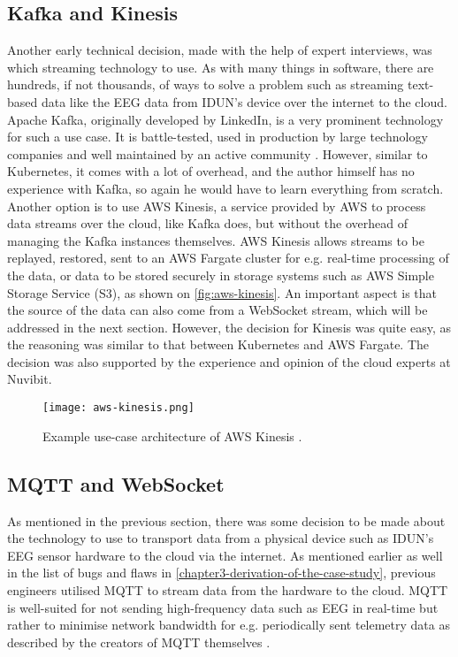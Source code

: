 \subsection{Kafka and Kinesis}
\label{chapter4-kafka-aws-kinesis}

Another early technical decision, made with the help of expert interviews, was which streaming technology to use. As with many things in software, there are hundreds, if not thousands, of ways to solve a problem such as streaming text-based data like the EEG data from IDUN's device over the internet to the cloud. Apache Kafka, originally developed by LinkedIn, is a very prominent technology for such a use case. It is battle-tested, used in production by large technology companies \citep{apache_apache_nodate} and well maintained by an active community \citep{noauthor_apache_2022}. However, similar to Kubernetes, it comes with a lot of overhead, and the author himself has no experience with Kafka, so again he would have to learn everything from scratch. Another option is to use AWS Kinesis, a service provided by AWS to process data streams over the cloud, like Kafka does, but without the overhead of managing the Kafka instances themselves. AWS Kinesis allows streams to be replayed, restored, sent to an AWS Fargate cluster for e.g. real-time processing of the data, or data to be stored securely in storage systems such as AWS Simple Storage Service (S3), as shown on \autoref{fig:aws-kinesis}. An important aspect is that the source of the data can also come from a WebSocket stream, which will be addressed in the next section. However, the decision for Kinesis was quite easy, as the reasoning was similar to that between Kubernetes and AWS Fargate. The decision was also supported by the experience and opinion of the cloud experts at Nuvibit.

\begin{figure}[!ht]
  \centering
  \texttt{[image: aws-kinesis.png]}
  \caption{Example use-case architecture of AWS Kinesis \citep{aws_amazon_nodate}.}
  \label{fig:aws-kinesis}
\end{figure}

\subsection{MQTT and WebSocket}
\label{chapter4-mqtt-and-websocket}

As mentioned in the previous section, there was some decision to be made about the technology to use to transport data from a physical device such as IDUN's EEG sensor hardware to the cloud via the internet. As mentioned earlier as well in the list of bugs and flaws in \autoref{chapter3-derivation-of-the-case-study}, previous engineers utilised MQTT to stream data from the hardware to the cloud. MQTT is well-suited for not sending high-frequency data such as EEG in real-time but rather to minimise network bandwidth for e.g. periodically sent telemetry data as described by the creators of MQTT themselves \citep{mqtt_use_nodate}.


